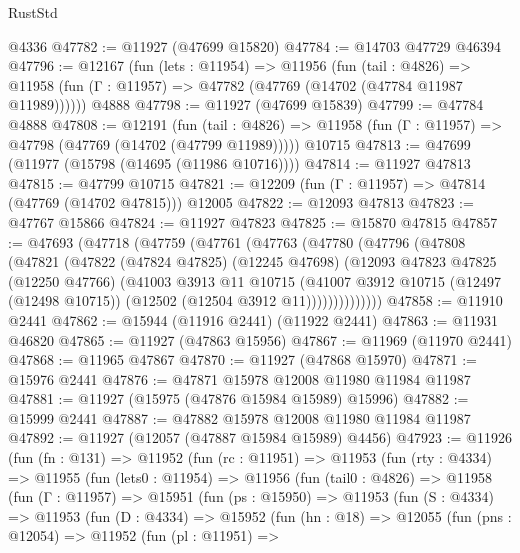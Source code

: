 \begin{lexlean}{RustStd}
\begin{coremodule}
    @4336
@47782 := @11927 (@47699 @15820)
@47784 := @14703 @47729 @46394
@47796 := @12167
    (fun (lets : @11954) =>
    @11956
      (fun (tail : @4826) =>
      @11958 (fun (Γ : @11957) => @47782 (@47769 (@14702 (@47784 @11987 @11989))))))
    @4888
@47798 := @11927 (@47699 @15839)
@47799 := @47784 @4888
@47808 := @12191
    (fun (tail : @4826) => @11958 (fun (Γ : @11957) => @47798 (@47769 (@14702 (@47799 @11989)))))
    @10715
@47813 := @47699 (@11977 (@15798 (@14695 (@11986 @10716))))
@47814 := @11927 @47813
@47815 := @47799 @10715
@47821 := @12209 (fun (Γ : @11957) => @47814 (@47769 (@14702 @47815))) @12005
@47822 := @12093 @47813
@47823 := @47767 @15866
@47824 := @11927 @47823
@47825 := @15870 @47815
@47857 := @47693
    (@47718
      (@47759
        (@47761
          (@47763
            (@47780
              (@47796
                (@47808
                  (@47821
                    (@47822
                      (@47824 @47825)
                      (@12245 @47698)
                      (@12093
                        @47823
                        @47825
                        (@12250 @47766)
                        (@41003
                          @3913
                          @11
                          @10715
                          (@41007
                            @3912
                            @10715
                            (@12497 (@12498 @10715))
                            (@12502 (@12504 @3912 @11))))))))))))))
@47858 := @11910 @2441
@47862 := @15944 (@11916 @2441) (@11922 @2441)
@47863 := @11931 @46820
@47865 := @11927 (@47863 @15956)
@47867 := @11969 (@11970 @2441)
@47868 := @11965 @47867
@47870 := @11927 (@47868 @15970)
@47871 := @15976 @2441
@47876 := @47871 @15978 @12008 @11980 @11984 @11987
@47881 := @11927 (@15975 (@47876 @15984 @15989) @15996)
@47882 := @15999 @2441
@47887 := @47882 @15978 @12008 @11980 @11984 @11987
@47892 := @11927 (@12057 (@47887 @15984 @15989) @4456)
@47923 := @11926
    (fun (fn : @131) =>
    @11952
      (fun (rc : @11951) =>
      @11953
        (fun (rty : @4334) =>
        @11955
          (fun (lets0 : @11954) =>
          @11956
            (fun (tail0 : @4826) =>
            @11958
              (fun (Γ : @11957) =>
              @15951
                (fun (ps : @15950) =>
                @11953
                  (fun (S : @4334) =>
                  @11953
                    (fun (D : @4334) =>
                    @15952
                      (fun (hn : @18) =>
                      @12055
                        (fun (pns : @12054) =>
                        @11952
                          (fun (pl : @11951) =>

\end{coremodule}
\end{lexlean}
